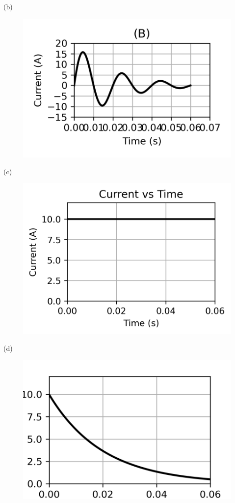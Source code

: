 \documentclass[12pt]{article}
\begin{document}
\begin{enumerate}
\begin{multicols}{2}
(b) \begin{figure}[H]
  \centering
  \includegraphics[width=0.7\columnwidth]{figs/damped_sine_wave1.png}
  \caption{}
\end{figure}

(c) \begin{figure}[H]
  \centering
  \includegraphics[width=0.7\columnwidth]{figs/constant_wave.png}
  \caption{}
\end{figure}

(d) \begin{figure}[H]
  \centering
  \includegraphics[width=0.7\columnwidth]{figs/exponential_current_rise.png}
  \caption{}
\end{figure}



\end{multicols}
\end{enumerate}
\end{document}
